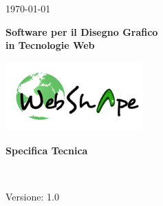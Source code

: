 \usepackage{multirow}
\title{\TITOLODOC}
\author{Dal Bosco Davide}



\renewcommand{\insertversion}{1.0} %
\renewcommand{\TITOLODOC}{Specifica Tecnica} %
\renewcommand{\glosspath}{.\glossario} %

\begin{titlepage}
\begin{center}
	\begin{Large}	\today \end{Large}
\end{center}

\vspace{20pt}

\begin{center}
	\begin{Huge}
				\textbf{\ajax}
	\end{Huge}
\end{center}			

\begin{center}
	\begin{large}
				\textbf{Software per il Disegno Grafico\\ in Tecnologie Web}
	\end{large}
\end{center}			

\vspace{20pt}

\begin{center}
\includegraphics[width=150pt]{../logo/logo}
\end{center}

\vspace{170pt}
\begin{center} %
	\begin{Huge}
				\textbf{\TITOLODOC}
	\end{Huge}
			\\
\end{center}
\vspace{190pt}
\begin{center}
Versione: \insertversion
\end{center}
\end{titlepage}

